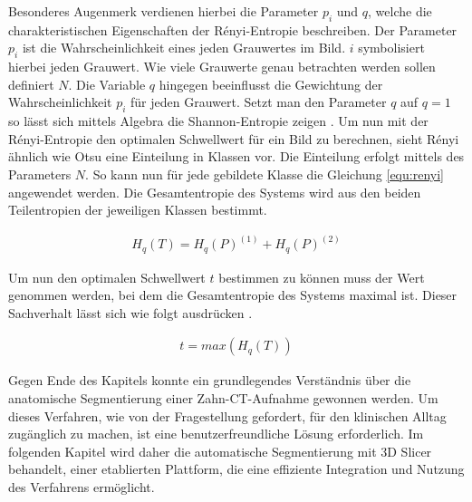 Besonderes Augenmerk verdienen hierbei die Parameter $p_{i}$ und $q$, welche die
charakteristischen Eigenschaften der Rényi-Entropie beschreiben. Der Parameter $p
_{i}$ ist die Wahrscheinlichkeit eines jeden Grauwertes im Bild. $i$
symbolisiert hierbei jeden Grauwert. Wie viele Grauwerte genau betrachten werden
sollen definiert $N$. Die Variable $q$ hingegen beeinflusst die Gewichtung der
Wahrscheinlichkeit $p_{i}$ für jeden Grauwert. Setzt man den Parameter $q$ auf $q
= 1$ so lässt sich mittels Algebra die Shannon-Entropie zeigen \citep[vgl.][K.~2]{bromiley2004}.
Um nun mit der Rényi-Entropie den optimalen Schwellwert für ein Bild zu berechnen,
sieht Rényi ähnlich wie Otsu eine Einteilung in Klassen vor. Die Einteilung erfolgt
mittels des Parameters $N$. So kann nun für jede gebildete Klasse die Gleichung
\ref{equ:renyi} angewendet werden. Die Gesamtentropie des Systems wird aus den beiden
Teilentropien der jeweiligen Klassen bestimmt\citep[vgl.][K.~2]{bromiley2004}.

\begin{align}
	H_{q}(T) = H_{q}(P)^{(1)}+ H_{q}(P)^{(2)}
\end{align}

Um nun den optimalen Schwellwert $t$ bestimmen zu können muss der Wert genommen
werden, bei dem die Gesamtentropie des Systems maximal ist. Dieser Sachverhalt
lässt sich wie folgt ausdrücken \citep[vgl.][K.~2]{bromiley2004}.

\begin{align}
	t = max(H_{q}(T))
\end{align}

Gegen Ende des Kapitels konnte ein grundlegendes Verständnis über die
anatomische Segmentierung einer Zahn-\ac{CT}-Aufnahme gewonnen werden. Um dieses
Verfahren, wie von der Fragestellung gefordert, für den klinischen Alltag
zugänglich zu machen, ist eine benutzerfreundliche Lösung erforderlich. Im
folgenden Kapitel wird daher die automatische Segmentierung mit 3D Slicer
behandelt, einer etablierten Plattform, die eine effiziente Integration und
Nutzung des Verfahrens ermöglicht.
